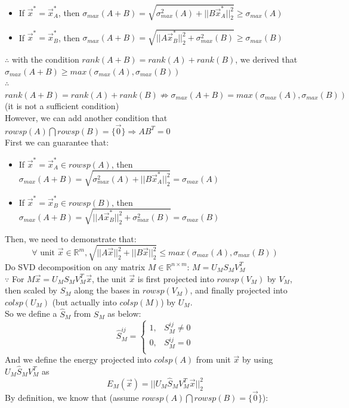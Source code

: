 \documentclass[letterpaper,11pt]{article}
\begin{document}
\begin{enumerate}
\begin{itemize}
\item If $\vec{x}^* = \vec{x}_A^*$, then $\sigma_{max}(A+B) = \sqrt{\sigma_{max}^2(A) + ||B\vec{x}_A^*||_2^2 } \geq \sigma_{max}(A)$
\item If $\vec{x}^* = \vec{x}_B^*$, then $\sigma_{max}(A+B) = \sqrt{||A\vec{x}_B^*||_2^2 + \sigma_{max}^2(B)} \geq \sigma_{max}(B)$
\end{itemize}
$\therefore$ with the condition $rank(A+B)=rank(A)+rank(B)$, we derived that $\sigma_{max}(A+B) \geq max (\sigma_{max} (A), \sigma_{max}(B))$\\
$\therefore$ $rank(A+B)=rank(A)+rank(B) \not \Rightarrow \sigma_{max}(A+B) = max (\sigma_{max} (A), \sigma_{max}(B))$ (it is not a sufficient condition)\\
However, we can add another condition that $rowsp(A) \bigcap rowsp(B) = \{\vec{0}\} \Rightarrow AB^T=0$\\
First we can guarantee that:
\begin{itemize}
\item If $\vec{x}^* = \vec{x}_A^* \in rowsp(A)$, then $\sigma_{max}(A+B) = \sqrt{\sigma_{max}^2(A) + ||B\vec{x}_A^*||_2^2 } = \sigma_{max}(A)$
\item If $\vec{x}^* = \vec{x}_B^* \in rowsp(B)$, then $\sigma_{max}(A+B) = \sqrt{||A\vec{x}_B^*||_2^2 + \sigma_{max}^2(B)} = \sigma_{max}(B)$
\end{itemize}
Then, we need to demonstrate that:
$$\forall\text{ unit }\vec{x} \in \mathbb{R}^m, \sqrt{||A\vec{x}||_2^2 + ||B\vec{x}||_2^2} \leq max(\sigma_{max}(A),\sigma_{max}(B))$$
Do SVD decomposition on any matrix $M \in \mathbb{R}^{n \times m}$: $M=U_MS_MV_M^T$\\
$\because$ For $M\vec{x}=U_MS_MV_M^T\vec{x}$, the unit $\vec{x}$ is first projected into $rowsp(V_M)$ by $V_M$, then scaled by $S_M$ along the bases in $rowsp(V_M)$, and finally projected into $colsp(U_M)$ (but actually into $colsp(M)$) by $U_M$.\\
So we define a $\hat{S}_M$ from $S_M$ as below:
$$\hat{S}_M^{ij}=\left\{\begin{array}{cl}
1, & S_M^{ij} \neq 0 \\
0, & S_M^{ij} = 0 \\
\end{array}\right.$$
And we define the energy projected into $colsp(A)$ from unit $\vec{x}$ by using $U_M\hat{S}_MV_M^T$ as $$E_M(\vec{x})=||U_M\hat{S}_MV_M^T\vec{x}||_2^2$$
By definition, we know that (assume $rowsp(A) \bigcap rowsp(B)=\{\vec{0}\}$):

\end{enumerate}
\end{document}
